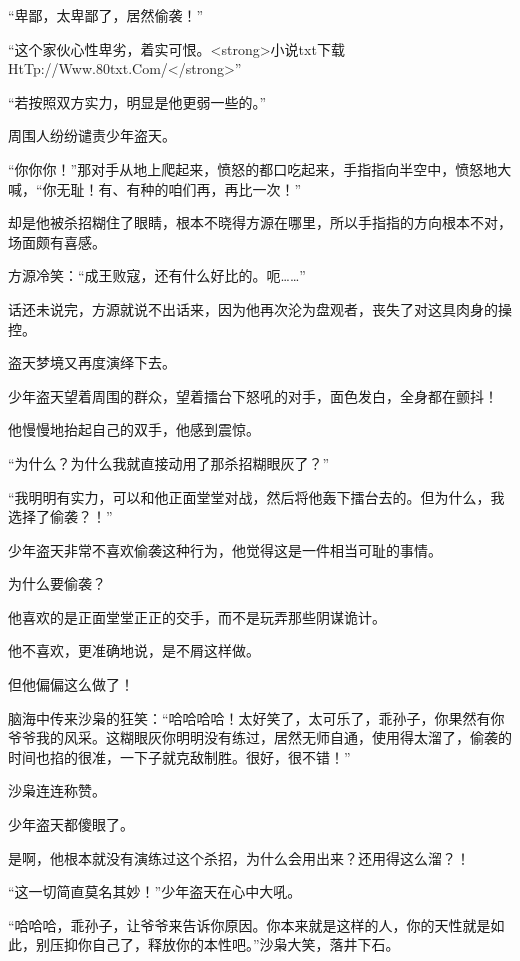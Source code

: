 
\begin{this_body}

“卑鄙，太卑鄙了，居然偷袭！”

“这个家伙心性卑劣，着实可恨。<strong>小说txt下载HtTp://Www.80txt.Com/</strong>”

“若按照双方实力，明显是他更弱一些的。”

周围人纷纷谴责少年盗天。

“你你你！”那对手从地上爬起来，愤怒的都口吃起来，手指指向半空中，愤怒地大喊，“你无耻！有、有种的咱们再，再比一次！”

却是他被杀招糊住了眼睛，根本不晓得方源在哪里，所以手指指的方向根本不对，场面颇有喜感。

方源冷笑：“成王败寇，还有什么好比的。呃……”

话还未说完，方源就说不出话来，因为他再次沦为盘观者，丧失了对这具肉身的操控。

盗天梦境又再度演绎下去。

少年盗天望着周围的群众，望着擂台下怒吼的对手，面色发白，全身都在颤抖！

他慢慢地抬起自己的双手，他感到震惊。

“为什么？为什么我就直接动用了那杀招糊眼灰了？”

“我明明有实力，可以和他正面堂堂对战，然后将他轰下擂台去的。但为什么，我选择了偷袭？！”

少年盗天非常不喜欢偷袭这种行为，他觉得这是一件相当可耻的事情。

为什么要偷袭？

他喜欢的是正面堂堂正正的交手，而不是玩弄那些阴谋诡计。

他不喜欢，更准确地说，是不屑这样做。

但他偏偏这么做了！

脑海中传来沙枭的狂笑：“哈哈哈哈！太好笑了，太可乐了，乖孙子，你果然有你爷爷我的风采。这糊眼灰你明明没有练过，居然无师自通，使用得太溜了，偷袭的时间也掐的很准，一下子就克敌制胜。很好，很不错！”

沙枭连连称赞。

少年盗天都傻眼了。

是啊，他根本就没有演练过这个杀招，为什么会用出来？还用得这么溜？！

“这一切简直莫名其妙！”少年盗天在心中大吼。

“哈哈哈，乖孙子，让爷爷来告诉你原因。你本来就是这样的人，你的天性就是如此，别压抑你自己了，释放你的本性吧。”沙枭大笑，落井下石。


\end{this_body}
